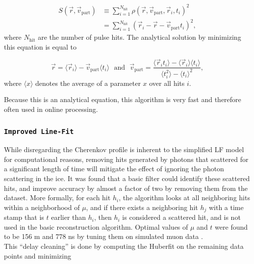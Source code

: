\begin{equation}
\label{eq:lf}
\begin{split}
S(\vec{r},\vec{v}_{\textrm{part}}) &\equiv \sum^{N_{\textrm{hit}}}_{i=1} \rho(\vec{r},\vec{v}_\textrm{part},\vec{r}_i,t_i)^2\\
&= \sum^{N_{\textrm{hit}}}_{i=1} \left(\vec{r}_i - \vec{r} - \vec{v}_\textrm{part}t_i \right)^2,
\end{split}
\end{equation}
\noindent where $N_\textrm{hit}$ are the number of pulse hits. The analytical solution by minimizing this equation is equal to

\begin{equation}
\vec{r} = \langle\vec{r}_i\rangle - \vec{v}_\textrm{part}\langle t_i\rangle \ \ \ \textrm{and}\ \ \ \vec{v}_\textrm{part} = \frac{\langle \vec{r}_i t_i\rangle - \langle \vec{r}_i \rangle \langle t_i \rangle }{\langle t_i^2 \rangle - \langle t_i \rangle^2},
\end{equation}
\noindent where $\langle x \rangle$ denotes the average of a parameter $x$ over all hits $i$.

Because this is an analytical equation, this algorithm is very fast and therefore often used in online processing.
 
\subsubsection{\texttt{Improved Line-Fit}}
While disregarding the Cherenkov profile is inherent to the simplified LF model for computational reasons, removing hits generated by photons that scattered for a significant length of time will mitigate the effect of ignoring the photon scattering in the ice. It was found that a basic filter could identify these scattered hits, and improve accuracy by almost a factor of two by removing them from the dataset. More formally, for each hit $h_i$, the algorithm looks at all neighboring hits within a neighborhood of $\mu$, and if there exists a neighboring hit $h_j$ with a time stamp that is $t$ earlier than $h_i$, then $h_i$ is considered a scattered hit, and is not used in the basic reconstruction algorithm. Optimal values of $\mu$ and $t$ were found to be 156 m and 778 ns by tuning them on simulated muon data \cite{Aartsen:2013bfa}.\\

\noindent This ``delay cleaning'' is done by computing the Huberfit on the remaining data points and minimizing

